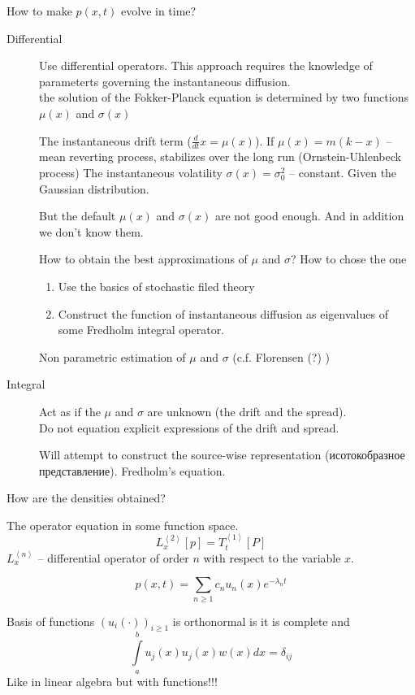 \documentclass[a4paper]{article}
\newcommand{\clo}[1]{{\left [ #1 \right ]}}
\newcommand{\brac}[1]{{\left ( #1 \right )}}
\newcommand{\brkt}[1]{{\left\langle #1 \right\rangle}}
\newcommand{\rus}[1]{\foreignlanguage{russian}{#1}}
\begin{document}
How to make $p(x,t)$ evolve in time? \begin{description}
	\item[Differential] Use differential operators. This approach requires the knowledge of parameterts governing the instantaneous diffusion.\hfill\\
	the solution of the Fokker-Planck equation is determined by two functions $\mu(x)$ and $\sigma(x)$

	The instantaneous drift term ($\frac{d}{dt} x = \mu(x)$).
	If $\mu(x) = m (k-x)$ -- mean reverting process, stabilizes over the long run (Ornstein-Uhlenbeck process)
	The instantaneous volatility $\sigma(x) = \sigma_0^2$ -- constant. Given the Gaussian distribution.

	But the default $\mu(x)$ and $\sigma(x)$ are not good enough. And in addition we don't know them.

	How to obtain the best approximations of $\mu$ and $\sigma$? How to chose the one 
	\begin{enumerate}
		\item Use the basics of stochastic filed theory
		\item Construct the function of instantaneous diffusion as eigenvalues of some Fredholm integral operator.
	\end{enumerate}

	Non parametric estimation of $\mu$ and $\sigma$	(c.f. Florensen (?) )

	\item[Integral] Act as if the $\mu$ and $\sigma$ are unknown (the drift and the spread). \hfill \\
	Do not equation explicit expressions of the drift and spread.

	Will attempt to construct the source-wise representation (\rus{исотокобразное представление}).
	Fredholm's equation.
	
\end{description}

How are the densities obtained?

The operator equation in some function space.
\[L_x^\brkt{2}\clo{p} = T_t^\brkt{1}\clo{P}\]
$L_x^\brkt{n}$ -- differential operator of order $n$ with respect to the variable $x$.

\[p(x,t) = \sum_{n\geq 1} c_n u_n(x) e^{-\lambda_n t}\]


Basis of functions $\brac{u_i(\cdot)}_{i\geq 1}$ is orthonormal is it is complete and
\[\int\limits_a^b u_j(x) u_j(x) w(x)dx = \delta_{ij}\]
Like in linear algebra but with functions!!!
\end{document}
